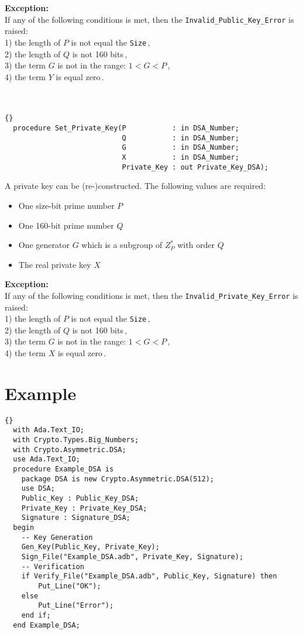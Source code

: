 \textbf{Exception:}\\ If any of the following conditions is met, then the \texttt{Invalid\_Public\_Key\_Error} is raised:\\
1) the length of $P$ is not equal the \texttt{Size}\,,\\
2) the length of $Q$ is not 160 bits\,, \\
3) the term $G$ is not in the range: $1<G<P$\,,\\
4) the term $Y$ is equal zero\,.\\
\hline \\ \ \\
\begin{lstlisting}{}
  procedure Set_Private_Key(P           : in DSA_Number;
                            Q           : in DSA_Number;
                            G           : in DSA_Number;
                            X           : in DSA_Number;
                            Private_Key : out Private_Key_DSA);
\end{lstlisting}
A private key can be (re-)constructed. The following values are required:
\begin{itemize}
\item One size-bit prime number $P$
\item One 160-bit prime number $Q$
\item One generator $G$ which is a subgroup of $Z^*_P$ with order $Q$
\item The real private key $X$
\end{itemize}
\textbf{Exception:}\\ If any of the following conditions is met, then the \texttt{Invalid\_Private\_Key\_Error} is raised:\\
1) the length of $P$ is not equal the \texttt{Size}\,,\\
2) the length of $Q$ is not 160 bits\,, \\
3) the term $G$ is not in the range: $1<G<P$\,,\\
4) the term $X$ is equal zero\,.
\section{Example}
\begin{lstlisting}{}
  with Ada.Text_IO;
  with Crypto.Types.Big_Numbers;
  with Crypto.Asymmetric.DSA;
  use Ada.Text_IO;
  procedure Example_DSA is
    package DSA is new Crypto.Asymmetric.DSA(512);
    use DSA;
    Public_Key : Public_Key_DSA;
    Private_Key : Private_Key_DSA;
    Signature : Signature_DSA;
  begin
    -- Key Generation
    Gen_Key(Public_Key, Private_Key);
    Sign_File("Example_DSA.adb", Private_Key, Signature);
    -- Verification
    if Verify_File("Example_DSA.adb", Public_Key, Signature) then
        Put_Line("OK");
    else 
        Put_Line("Error");
    end if;
  end Example_DSA;
\end{lstlisting}